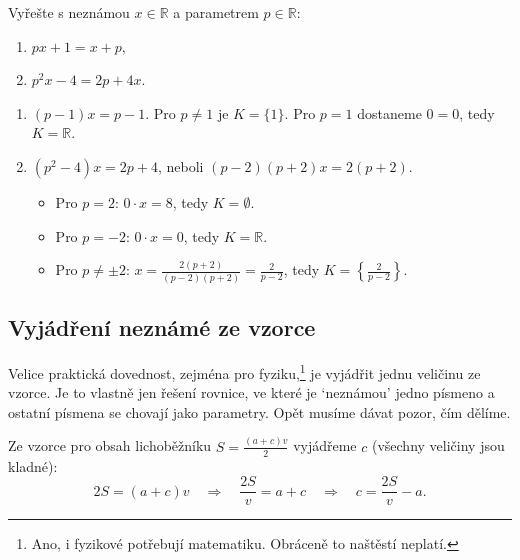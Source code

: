 \begin{problem}
  Vyřešte s neznámou $x\in\mathbb{R}$ a parametrem $p\in\mathbb{R}$:
  \begin{enumerate}[label=(\alph*)]
    \item $px + 1 = x + p$,
    \item $p^2x - 4 = 2p + 4x$.
  \end{enumerate}
\end{problem}

\begin{solution}
  \begin{enumerate}[label=(\alph*)]
    \item $(p - 1)x = p - 1$. Pro $p\neq 1$ je $K = \{1\}$. Pro $p = 1$ dostaneme $0 = 0$, tedy $K = \mathbb{R}$.
    \item $(p^2 - 4)x = 2p + 4$, neboli $(p - 2)(p + 2)x = 2(p + 2)$.
    \begin{itemize}
      \item Pro $p = 2$: $0\cdot x = 8$, tedy $K = \emptyset$.
      \item Pro $p = -2$: $0\cdot x = 0$, tedy $K = \mathbb{R}$.
      \item Pro $p\neq\pm 2$: $x = \frac{2(p + 2)}{(p - 2)(p + 2)} = \frac{2}{p - 2}$, tedy $K = \left\{\frac{2}{p - 2}\right\}$.
    \end{itemize}
  \end{enumerate}
\end{solution}

\subsection{Vyjádření neznámé ze vzorce}

Velice praktická dovednost, zejména pro fyziku,\footnote{Ano, i fyzikové potřebují matematiku. Obráceně to naštěstí neplatí.} je vyjádřit jednu veličinu ze vzorce. Je to vlastně jen řešení rovnice, ve které je `neznámou' jedno písmeno a ostatní písmena se chovají jako parametry. Opět musíme dávat pozor, čím dělíme.

\begin{example}
  Ze vzorce pro obsah lichoběžníku $S = \frac{(a + c)v}{2}$ vyjádřeme $c$ (všechny veličiny jsou kladné):
  \begin{equation*}
    2S = (a + c)v\quad\Rightarrow\quad \frac{2S}{v} = a + c\quad\Rightarrow\quad c = \frac{2S}{v} - a.
  \end{equation*}
\end{example}

